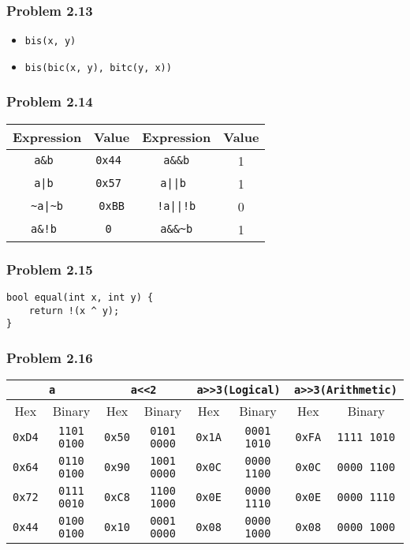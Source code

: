 \documentclass[a4paper]{article}
\newcommand{\wav}{\textasciitilde}
\begin{document}
\subsubsection*{Problem 2.13}
\begin{itemize}
    \item[] \tt{bis(x, y)}
    \item[] \tt{bis(bic(x, y), bitc(y, x))} 
\end{itemize}

\subsubsection*{Problem 2.14}
\begin{tabular}{cccc}
    Expression  &Value      &Expression &Value\\
    \hline
    \tt{a\&b}   &\tt{0x44}  &\tt{a\&\&b}&1\\
    \tt{a|b}    &\tt{0x57}  &\tt{a||b}  &1\\
    \tt{\wav a|\wav b}&\tt{0xBB}&\tt{!a||!b}&0\\
    \tt{a\&!b}  &\tt{0}     &\tt{a\&\&\wav b}&1
    
\end{tabular}

\subsubsection*{Problem 2.15}
\begin{lstlisting}
bool equal(int x, int y) {
    return !(x ^ y);
}
\end{lstlisting}

\subsubsection*{Problem 2.16}
\begin{tabular}{cc|cc|cc|cc}
    \multicolumn{2}{c|}{\tt{a}}&\multicolumn{2}{|c|}{\tt{a<<2}}&\multicolumn{2}{|c|}{\tt{a>>3}(Logical)}&\multicolumn{2}{|c}{\tt{a>>3}(Arithmetic)}\\
    \hline
    Hex&Binary&Hex&Binary&Hex&Binary&Hex&Binary\\
    \hline
    \tt{0xD4}&\tt{1101 0100}&\tt{0x50}&\tt{0101 0000}&\tt{0x1A}&\tt{0001 1010}&\tt{0xFA}&\tt{1111 1010}\\
    \tt{0x64}&\tt{0110 0100}&\tt{0x90}&\tt{1001 0000}&\tt{0x0C}&\tt{0000 1100}&\tt{0x0C}&\tt{0000 1100}\\
    \tt{0x72}&\tt{0111 0010}&\tt{0xC8}&\tt{1100 1000}&\tt{0x0E}&\tt{0000 1110}&\tt{0x0E}&\tt{0000 1110}\\
    \tt{0x44}&\tt{0100 0100}&\tt{0x10}&\tt{0001 0000}&\tt{0x08}&\tt{0000 1000}&\tt{0x08}&\tt{0000 1000}
\end{tabular}
\end{document}
